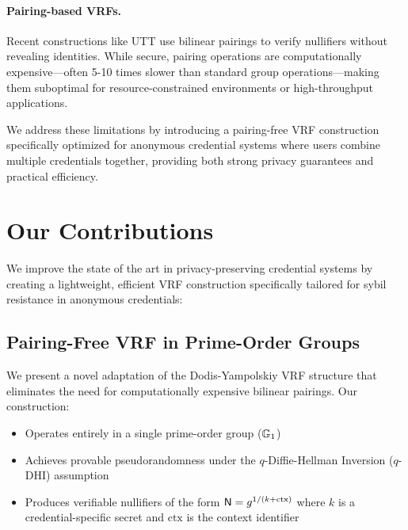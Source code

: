 \paragraph{Pairing-based VRFs.} Recent constructions like UTT use bilinear pairings to verify nullifiers without revealing identities. While secure, pairing operations are computationally expensive—often 5-10 times slower than standard group operations—making them suboptimal for resource-constrained environments or high-throughput applications.

We address these limitations by introducing a pairing-free VRF construction specifically optimized for anonymous credential systems where users combine multiple credentials together, providing both strong privacy guarantees and practical efficiency.












\section{Our Contributions}

We improve the state of the art in privacy-preserving credential systems by creating a lightweight, efficient VRF construction specifically tailored for sybil resistance in anonymous credentials:

\subsection{Pairing-Free VRF in Prime-Order Groups}

We present a novel adaptation of the Dodis-Yampolskiy VRF structure that eliminates the need for computationally expensive bilinear pairings. Our construction:

\begin{itemize}
    \item Operates entirely in a single prime-order group ($\mathbb{G}_1$)
    \item Achieves provable pseudorandomness under the $q$-Diffie-Hellman Inversion ($q$-DHI) assumption
    \item Produces verifiable nullifiers of the form $\mathsf{N} = g^{1/(k+\text{ctx})}$ where $k$ is a credential-specific secret and $\text{ctx}$ is the context identifier
\end{itemize}

